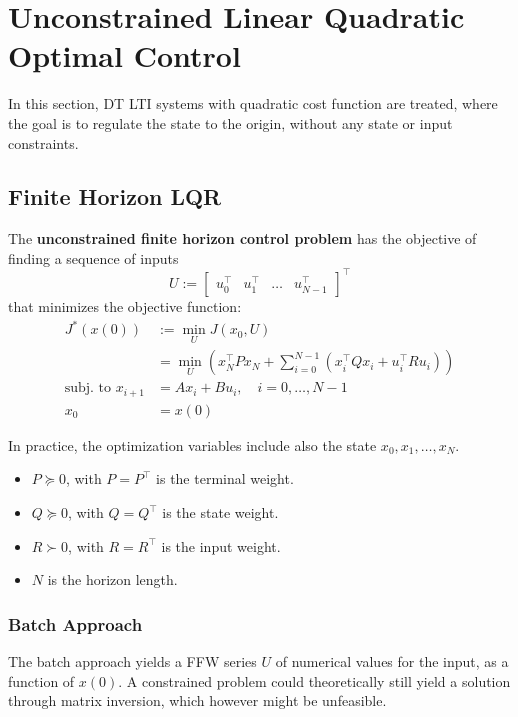 \section{Unconstrained Linear Quadratic Optimal Control}
In this section, DT LTI systems with quadratic cost function are treated, where the goal is to regulate the state to the origin, without any state or input constraints.
\subsection{Finite Horizon LQR}

The \textbf{unconstrained finite horizon control problem} has the objective of finding a sequence of inputs
\begin{equation*}
    U := \begin{bmatrix} u_0^\top & u_1^\top & \dots & u_{N-1}^\top \end{bmatrix}^\top
\end{equation*}
that minimizes the objective function:
\begin{align*}
    J^*(x(0))                & := \min_U J(x_0,U)                                                                          \\
                             & = \min_U \left( x_N^\top P x_N + \sum_{i=0}^{N-1} (x_i^\top Q x_i + u_i^\top R u_i) \right) \\
    \text{subj.\ to }x_{i+1} & = A x_i + B u_i, \quad i = 0, \dots, N-1                                                    \\
    x_0                      & = x(0)
\end{align*}

In practice, the optimization variables include also the state $x_0, x_1, \dots, x_N$.

\newpar{}

\begin{itemize}
    \item $P \succeq 0$, with $P = P^\top$ is the terminal weight.
    \item $Q \succeq 0$, with $Q = Q^\top$ is the state weight.
    \item $R \succ 0$, with $R = R^\top$ is the input weight.
    \item $N$ is the horizon length.
\end{itemize}

\subsubsection{Batch Approach}\label{unconst_lqr}
The batch approach yields a FFW series $U$ of numerical values for the input, as a function of $x(0)$. A constrained problem could theoretically still yield a solution through matrix inversion, which however might be unfeasible.

